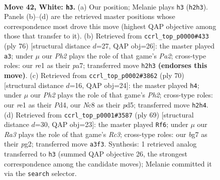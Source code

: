 \documentclass[11pt]{article}
\begin{document}
\clearpage

\begin{figure}[p]\centering
\begin{subfigure}{0.46\textwidth}\centering
\resizebox{\linewidth}{!}{%
\newchessgame
\chessboard[
  setfen={2N5/1p4bk/6p1/5p1p/Pr6/R5P1/5PKP/4r3 w - - 2 42},
  showmover=false,
  pgfstyle=straightmove, color=movearrow, markmove={h2-h3}
]}
\caption{}
\end{subfigure}\hfill
\begin{subfigure}{0.46\textwidth}\centering
\resizebox{\linewidth}{!}{%
\newchessgame
\chessboard[
  setfen={8/p2k4/3p2r1/1pp3PR/8/1P6/PKP5/8 w - - 0 39},
  showmover=false,
  pgfstyle=straightmove, color=movearrow, markmove={a2-a3}
]}
\caption{}
\end{subfigure}
\\[4pt]
\begin{subfigure}{0.46\textwidth}\centering
\resizebox{\linewidth}{!}{%
\newchessgame
\chessboard[
  setfen={8/N2n1k1p/4p1p1/3p4/3P4/1r4P1/1PR2PKP/8 w - - 4 36},
  showmover=false,
  pgfstyle=straightmove, color=movearrow, markmove={h2-h4}
]}
\caption{}
\end{subfigure}\hfill
\begin{subfigure}{0.46\textwidth}\centering
\resizebox{\linewidth}{!}{%
\newchessgame
\chessboard[
  setfen={8/5pk1/p1r3p1/R6p/7P/5P1K/P5P1/8 b - - 4 35},
  showmover=false,
  pgfstyle=straightmove, color=movearrow, markmove={c6-f6}
]}
\caption{}
\end{subfigure}
\caption{\textbf{Move 42, White: \texttt{h3}.} (a) Our position; Melanie plays \texttt{h3} (\texttt{h2h3}). Panels (b)--(d) are the retrieved master positions whose correspondence most drove this move (highest QAP objective among those that transfer to it). (b) Retrieved from \texttt{ccrl\_top\_p0000\#433} (ply 76) [structural distance $d$=27, QAP obj=26]: the master played \texttt{a3}; under $\mu$ our \emph{Ph2} plays the role of that game's \emph{Pa2}; cross-type roles: our \emph{r}e1 as their \emph{p}a7; transferred move \texttt{h2h3} \textbf{(endorses this move)}. (c) Retrieved from \texttt{ccrl\_top\_p0002\#3862} (ply 70) [structural distance $d$=16, QAP obj=24]: the master played \texttt{h4}; under $\mu$ our \emph{Ph2} plays the role of that game's \emph{Ph2}; cross-type roles: our \emph{r}e1 as their \emph{P}d4, our \emph{N}c8 as their \emph{p}d5; transferred move \texttt{h2h4}. (d) Retrieved from \texttt{ccrl\_top\_p0001\#3587} (ply 69) [structural distance $d$=30, QAP obj=23]: the master played \texttt{Rf6}; under $\mu$ our \emph{Ra3} plays the role of that game's \emph{Rc3}; cross-type roles: our \emph{b}g7 as their \emph{p}g2; transferred move \texttt{a3f3}. Synthesis: 1 retrieved analog transferred to \texttt{h3} (summed QAP objective 26, the strongest correspondence among the candidate moves); Melanie committed it via the \texttt{search} selector.}
\label{fig:thought-m82}
\end{figure}
\end{document}
